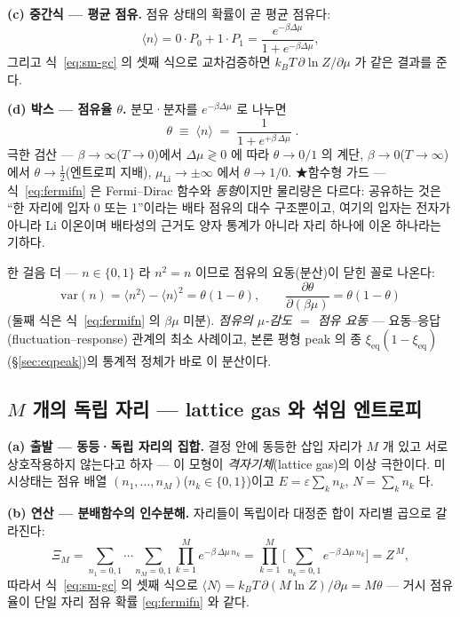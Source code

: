 \documentclass[11pt,a4paper]{article}
\newcommand{\eq}{\mathrm{eq}}
\begin{document}
\textbf{(c) 중간식 --- 평균 점유.} 점유 상태의 확률이 곧 평균 점유다:
\begin{equation}
\langle n\rangle=0\cdot P_0+1\cdot P_1
=\frac{e^{-\beta\Delta\mu}}{1+e^{-\beta\Delta\mu}},
\label{eq:sm-occmid}
\end{equation}
그리고 식~\eqref{eq:sm-gc} 의 셋째 식으로 교차검증하면 $k_BT\,\partial\ln Z/\partial\mu$ 가 같은 결과를 준다.

\textbf{(d) 박스 --- 점유율 $\theta$.} 분모·분자를 $e^{-\beta\Delta\mu}$ 로 나누면
\begin{equation}
\boxed{\;\theta\;\equiv\;\langle n\rangle\;=\;\frac{1}{1+e^{+\beta\,\Delta\mu}}\;.}
\label{eq:fermifn}
\end{equation}
극한 검산 --- $\beta\to\infty$($T\to0$)에서 $\Delta\mu\gtrless0$ 에 따라 $\theta\to0/1$ 의 계단,
$\beta\to0$($T\to\infty$)에서 $\theta\to\tfrac12$(엔트로피 지배), $\mu_\mathrm{Li}\to\pm\infty$ 에서
$\theta\to1/0$. ★함수형 가드 --- 식~\eqref{eq:fermifn} 은 Fermi--Dirac 함수와 \emph{동형}이지만 물리량은
다르다: 공유하는 것은 ``한 자리에 입자 0 또는 1''이라는 배타 점유의 대수 구조뿐이고, 여기의 입자는 전자가
아니라 Li 이온이며 배타성의 근거도 양자 통계가 아니라 자리 하나에 이온 하나라는 기하다.

한 걸음 더 --- $n\in\{0,1\}$ 라 $n^2=n$ 이므로 점유의 요동(분산)이 닫힌 꼴로 나온다:
\begin{equation}
\mathrm{var}(n)=\langle n^2\rangle-\langle n\rangle^2=\theta(1-\theta),
\qquad
\frac{\partial\theta}{\partial(\beta\mu)}=\theta(1-\theta)
\label{eq:sm-flucres}
\end{equation}
(둘째 식은 식~\eqref{eq:fermifn} 의 $\beta\mu$ 미분). \emph{점유의 $\mu$-감도 $=$ 점유 요동} --- 요동--응답
(fluctuation--response) 관계의 최소 사례이고, 본론 평형 peak 의 종 $\xi_\eq(1-\xi_\eq)$(\S\ref{sec:eqpeak})의
통계적 정체가 바로 이 분산이다.

\subsection{$M$ 개의 독립 자리 --- lattice gas 와 섞임 엔트로피}\label{sec:sm-lattice}
\textbf{(a) 출발 --- 동등·독립 자리의 집합.} 결정 안에 동등한 삽입 자리가 $M$ 개 있고 서로 상호작용하지
않는다고 하자 --- 이 모형이 \emph{격자기체}(lattice gas)의 이상 극한이다. 미시상태는 점유 배열
$(n_1,\dots,n_M)$($n_k\in\{0,1\}$)이고 $E=\varepsilon\sum_kn_k$, $N=\sum_kn_k$ 다.

\textbf{(b) 연산 --- 분배함수의 인수분해.} 자리들이 독립이라 대정준 합이 자리별 곱으로 갈라진다:
\begin{equation}
\Xi_M=\sum_{n_1=0,1}\!\cdots\!\sum_{n_M=0,1}\prod_{k=1}^{M}e^{-\beta\,\Delta\mu\,n_k}
=\prod_{k=1}^{M}\Big[\sum_{n_k=0,1}e^{-\beta\,\Delta\mu\,n_k}\Big]=Z^{\,M},
\label{eq:sm-factor}
\end{equation}
따라서 식~\eqref{eq:sm-gc} 의 셋째 식으로 $\langle N\rangle=k_BT\,\partial(M\ln Z)/\partial\mu=M\theta$ ---
거시 점유율이 단일 자리 점유 확률 \eqref{eq:fermifn} 와 같다.
\end{document}
